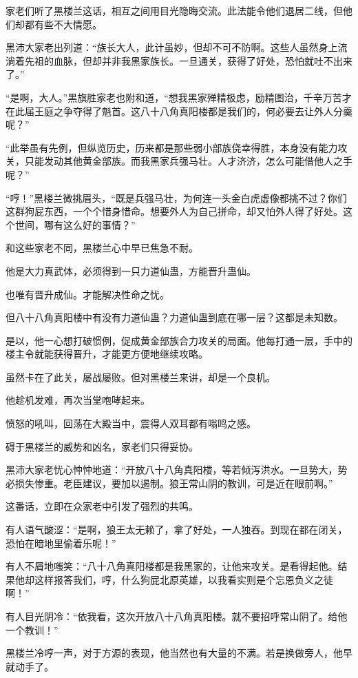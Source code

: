 \begin{this_body}
家老们听了黑楼兰这话，相互之间用目光隐晦交流。此法能令他们退居二线，但他们却都有些不大情愿。

黑沛大家老出列道：“族长大人，此计虽妙，但却不可不防啊。这些人虽然身上流淌着先祖的血脉，但却并非我黑家族长。一旦通关，获得了好处，恐怕就吐不出来了。”

“是啊，大人。”黑旗胜家老也附和道，“想我黑家殚精极虑，励精图治，千辛万苦才在此届王庭之争夺得了魁首。这八十八角真阳楼都是我们的，何必要去让外人分羹呢？”

“此举虽有先例，但纵览历史，历来都是那些弱小部族侥幸得胜，本身没有能力攻关，只能发动其他黄金部族。而我黑家兵强马壮。人才济济，怎么可能借他人之手呢？”

“哼！”黑楼兰微挑眉头，“既是兵强马壮，为何连一头金白虎虚像都挑不过？你们这群狗屁东西，一个个惜身惜命。想要外人为自己拼命，却又怕外人得了好处。这个世间，哪有这么好的事情？”

和这些家老不同，黑楼兰心中早已焦急不耐。

他是大力真武体，必须得到一只力道仙蛊，方能晋升蛊仙。

也唯有晋升成仙。才能解决性命之忧。

但八十八角真阳楼中有没有力道仙蛊？力道仙蛊到底在哪一层？这都是未知数。

是以，他一心想打破惯例，促成黄金部族合力攻关的局面。他每打通一层，手中的楼主令就能获得晋升，才能更方便地继续攻略。

虽然卡在了此关，屡战屡败。但对黑楼兰来讲，却是一个良机。

他趁机发难，再次当堂咆哮起来。

愤怒的吼叫，回荡在大殿当中，震得人双耳都有嗡鸣之感。

碍于黑楼兰的威势和凶名，家老们只得妥协。

黑沛大家老忧心忡忡地道：“开放八十八角真阳楼，等若倾泻洪水。一旦势大，势必损失惨重。老臣建议，要加以遏制。狼王常山阴的教训，可是近在眼前啊。”

这番话，立即在众家老中引发了强烈的共鸣。

有人语气酸涩：“是啊，狼王太无赖了，拿了好处，一人独吞。到现在都在闭关，恐怕在暗地里偷着乐呢！”

有人不屑地嗤笑：“八十八角真阳楼都是我黑家的，让他来攻关。是看得起他。结果他却这样报答我们，哼，什么狗屁北原英雄，以我看实则是个忘恩负义之徒啊！”

有人目光阴冷：“依我看，这次开放八十八角真阳楼。就不要招呼常山阴了。给他一个教训！”

黑楼兰冷哼一声，对于方源的表现，他当然也有大量的不满。若是换做旁人，他早就动手了。


\end{this_body}
